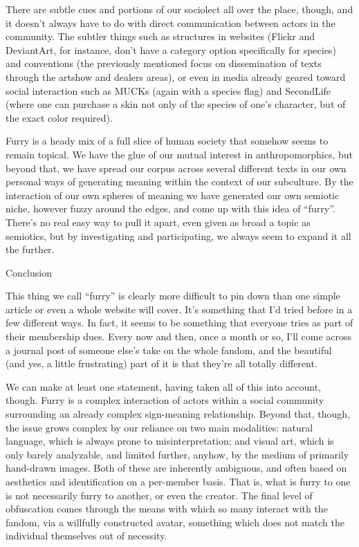 There are subtle cues and portions of our sociolect all over the place, though, and it doesn't always have to do with direct communication between actors in the community. The subtler things such as structures in websites (Flickr and DeviantArt, for instance, don't have a category option specifically for species) and conventions (the previously mentioned focus on dissemination of texts through the artshow and dealers areas), or even in media already geared toward social interaction such as MUCKs (again with a species flag) and SecondLife (where one can purchase a skin not only of the species of one's character, but of the exact color required).

Furry is a heady mix of a full slice of human society that somehow seems to remain topical. We have the glue of our mutual interest in anthropomorphics, but beyond that, we have spread our corpus across several different texts in our own personal ways of generating meaning within the context of our subculture. By the interaction of our own spheres of meaning we have generated our own semiotic niche, however fuzzy around the edges, and come up with this idea of ``furry''. There's no real easy way to pull it apart, even given as broad a topic as semiotics, but by investigating and participating, we always seem to expand it all the further.

Conclusion

This thing we call ``furry'' is clearly more difficult to pin down than one simple article or even a whole website will cover. It's something that I'd tried before in a few different ways. In fact, it seems to be something that everyone tries as part of their membership dues. Every now and then, once a month or so, I'll come across a journal post of someone else's take on the whole fandom, and the beautiful (and yes, a little frustrating) part of it is that they're all totally different.

We can make at least one statement, having taken all of this into account, though. Furry is a complex interaction of actors within a social community surrounding an already complex sign-meaning relationship. Beyond that, though, the issue grows complex by our reliance on two main modalities: natural language, which is always prone to misinterpretation; and visual art, which is only barely analyzable, and limited further, anyhow, by the medium of primarily hand-drawn images. Both of these are inherently ambiguous, and often based on aesthetics and identification on a per-member basis. That is, what is furry to one is not necessarily furry to another, or even the creator. The final level of obfuscation comes through the means with which so many interact with the fandom, via a willfully constructed avatar, something which does not match the individual themselves out of necessity.

